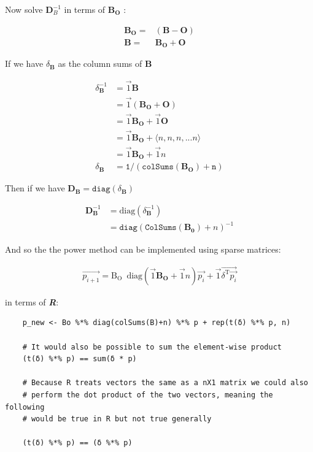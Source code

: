 \documentclass[11pt, twoside]{report}
\begin{document}
Now solve \(\mathbf{D}_B^{- 1}\) in terms of \(\mathbf{B_{O}}\) :

\begin{align}
  \mathbf{B}_{\mathbf{\mathbf{O}}} = & (\mathbf{B}-\mathbf{O})\\
  \mathbf{B} = & \mathbf{B}_{\mathbf{\mathbf{O}}}
  +\mathbf{O}
\end{align}

If we have \(\delta_{\mathbf{B}}\) as the column sums of \(\mathbf{B}\)


\begin{align}
\delta^{-1}_{\mathbf{B}} &= \vec{1}\mathbf{B} \\
&= \vec{1} \left( \mathbf{B_{O}} + \mathbf{O}\right) \\
&= \vec{1}  \mathbf{B_{O}} + \vec{1}\mathbf{O} \\
&= \vec{1} \mathbf{B_{\mathbf{O}}} + \langle n, n, n, ... n \rangle \\
&= \vec{1} \mathbf{B_{\mathbf{O}}} + \vec{1} n \\
\delta_{\mathbf{B}}&=\mathtt{1/(colSums(\mathbf{B_{O}}) + n )}
\end{align}

Then if we have \(\mathbf{D}_{\mathbf{B}} = \mathtt{diag}\left( \delta_{\mathbf{B}} \right)\)


   \begin{align}
	\mathbf{D}_{\mathbf{B}}^{-1} &= \mathrm{diag}\left( \delta_{\mathbf{B}}^{- 1} \right) \\
	&= \mathtt{diag} \left( \mathtt{ColSums \left( \mathbf{B_0} \right)} +  n \right)^{- 1}
\end{align}


And so the the power method can be implemented using sparse matrices:

\begin{align}
\vec{p_{i+1}} = \mathrm{B_{O}} \enspace \mathrm{diag}\left( \vec{1} \mathbf{B_{O}} + \vec{1}n \right) \vec{p_{i}} + \vec{1} \vec{\delta^{\mathrm{T}}\vec{p_{i}}}
\end{align}

in terms of \textbf{\emph{R}}:


\begin{tcolorbox}
    \begin{verbatim}
    p_new <- Bo %*% diag(colSums(B)+n) %*% p + rep(t(δ) %*% p, n)

    # It would also be possible to sum the element-wise product
    (t(δ) %*% p) == sum(δ * p)

    # Because R treats vectors the same as a nX1 matrix we could also
    # perform the dot product of the two vectors, meaning the following
    # would be true in R but not true generally

    (t(δ) %*% p) == (δ %*% p)
    \end{verbatim}
\end{tcolorbox}
\end{document}
